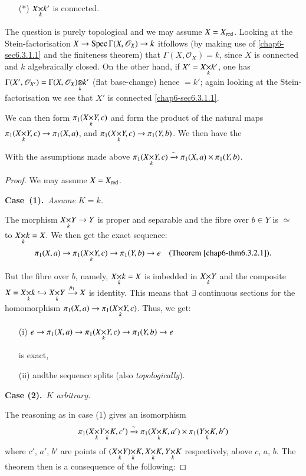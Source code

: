 \begin{itemize}
\item[(*)] $\fprod{X}{k'}{k}$ is connected.
\end{itemize}

The question is purely topological and we may assume
$X=X_{\operatorname{red}}$. Looking at the Stein-factorisation $X\to \operatorname{Spec}
\Gamma(X,\mathscr{O}_{X})\to k$ it\pageoriginale follows (by making
use of \ref{chap6-sec6.3.1.1} and the finiteness theorem) that
$\Gamma(X,\mathscr{O}_{X})=k$, since $X$ is connected and $k$
algebraically closed. On the other hand, if $X'=\fprod{X}{k'}{k}$, one
has
$\Gamma(X',\mathscr{O}_{X'})=\foprod{\Gamma(X,\mathscr{O}_{X})}{k'}{k}$
(flat base-change) hence $=k'$; again looking at the
Stein-factorisation we see that $X'$ is connected \ref{chap6-sec6.3.1.1}. 

We can then form $\pi_{1}(\fprod{X}{Y}{k},c)$ and form the product of
the natural maps $\pi_{1}(\fprod{X}{Y}{k},c)\to \pi_{1}(X,a)$, and
$\pi_{1}(\fprod{X}{Y}{k},c)\to \pi_{1}(Y,b)$. We then have the

\begin{prop}\label{chap7-prop7.3.1}
With the assumptions made above
$\pi_{1}(\fprod{X}{Y}{k},c)\xrightarrow{\sim}\pi_{1}(X,a)\times
\pi_{1}(Y,b)$. 
\end{prop}

\begin{proof}
We may assume $X=X_{\operatorname{red}}$.

\medskip
\noindent
{\bf Case~(1).}~{\em Assume $K=k$.}
\smallskip

The morphism $\fprod{X}{Y}{k}\to Y$ is proper and separable and the
fibre over $b\in Y$ is $\simeq$ to $\fprod{X}{k}{k}=X$. We then get
the exact sequence:
$$
\pi_{1}(X,a)\to \pi_{1}(\fprod{X}{Y}{k},c)\to \pi_{1}(Y,b)\to e\quad
\text{(Theorem \ref{chap6-thm6.3.2.1}).} 
$$

But the fibre over $b$, namely, $\fprod{X}{k}{k}=X$ is imbedded in
$\fprod{X}{Y}{k}$ and the composite $X=\fprod{X}{k}{k}\hookrightarrow
\fprod{X}{Y}{k}\xrightarrow{p_{1}}X$ is identity. This means that
$\exists$ continuous sections for the homomorphism $\pi_{1}(X,a)\to
\pi_{1}(\fprod{X}{Y}{k},c)$. Thus, we get:
\begin{itemize}
\item[(i)] $e\to \pi_{1}(X,a)\to \pi_{1}(\fprod{X}{Y}{k},c)\to \pi_{1}(Y,b)\to
e$ 


is exact,

\item[(ii)] and\pageoriginale the sequence splits (also {\em
  topologically}). 
\end{itemize}

\medskip
\noindent
{\bf Case (2).}~{\em $K$ arbitrary.}
\smallskip

The reasoning as in case (1) gives an isomorphism
$$
\pi_{1}(\fprod{X}{\fprod{Y}{K}{k}}{k},c')\xrightarrow{\sim}\pi_{1}(\fprod{X}{K}{k},a')\times\pi_{1}(\fprod{Y}{K}{k},b') 
$$
where $c'$, $a'$, $b'$ are points of $\fprod{(\fprod{X}{Y}{k})}{K}{k},
\fprod{X}{K}{k},\fprod{Y}{K}{k}$ respectively, above $c$, $a$,
$b$. The theorem then is a consequence of the following:
\end{proof}

